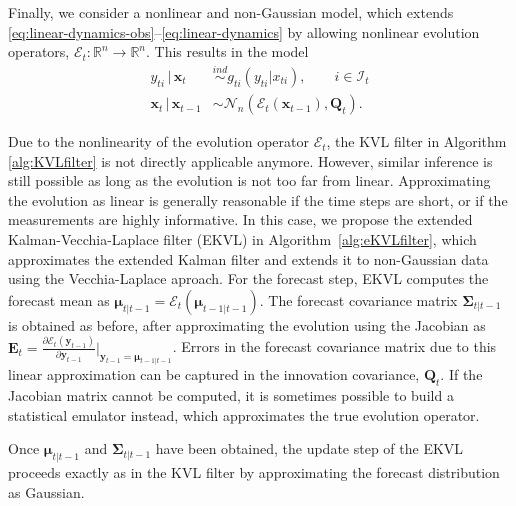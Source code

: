\documentclass[12pt,letterpaper]{article}
\theoremstyle{propstyle}
\theoremstyle{propstyle}
\theoremstyle{propstyle}
\theoremstyle{propstyle}
\theoremstyle{propstyle}
\newcommand{\bx}{\mathbf{x}}
\newcommand{\by}{\mathbf{y}}
\newcommand{\bQ}{\mathbf{Q}}
\newcommand{\bfmu}{\bm{\mu}}
\newcommand{\bfSigma}{\bm{\Sigma}}
\newcommand{\normal}{\mathcal{N}}
\newcommand{\evol}{\mathcal{E}}
\newcommand{\levol}{\mathbf{E}}
\newcommand{\obs}{\mathcal{I}}
\begin{document}
Finally, we consider a nonlinear and non-Gaussian model, which extends \eqref{eq:linear-dynamics-obs}--\eqref{eq:linear-dynamics} by allowing nonlinear evolution operators, $\evol_t: \mathbb{R}^n \rightarrow \mathbb{R}^n$. This results in the model
\begin{align}
\label{eq:obs} y_{ti} \,|\, \bx_t & \stackrel{ind}{\sim} g_{ti}(y_{ti} | x_{ti}), \qquad i \in \obs_t \\
\label{eq:evol} \bx_t \,|\, \bx_{t-1} & \sim \normal_n(\evol_t(\bx_{t-1}),\bQ_t).
\end{align}

Due to the nonlinearity of the evolution operator $\evol_t$, the KVL filter in Algorithm \ref{alg:KVLfilter} is not directly applicable anymore. However, similar inference is still possible as long as the evolution is not too far from linear. Approximating the evolution as linear is generally reasonable if the time steps are short, or if the measurements are highly informative. In this case, we propose the extended Kalman-Vecchia-Laplace filter (EKVL) in Algorithm~\ref{alg:eKVLfilter}, which approximates the extended Kalman filter \citep[e.g.,][Ch.~5]{Grewal1993} and extends it to non-Gaussian data using the Vecchia-Laplace aproach. For the forecast step, EKVL computes the forecast mean as $\bfmu_{t|t-1} = \evol_t(\bfmu_{t-1|t-1})$. The forecast covariance matrix $\bfSigma_{t|t-1}$ is obtained as before, after approximating the evolution using the Jacobian as $\levol_t = \frac{\partial \evol_t(\by_{t-1})}{\partial \by_{t-1}} \big|_{\by_{t-1} = \bfmu_{t-1|t-1} }$.  Errors in the forecast covariance matrix due to this linear approximation can be captured in the innovation covariance, $\bQ_t$. If the Jacobian matrix cannot be computed, it is sometimes possible to build a statistical emulator \citep[e.g.,][]{Kaufman2011} instead, which approximates the true evolution operator.

Once $\bfmu_{t|t-1}$ and $\bfSigma_{t|t-1}$ have been obtained, the update step of the EKVL proceeds exactly as in the KVL filter by approximating the forecast distribution as Gaussian.
\end{document}
